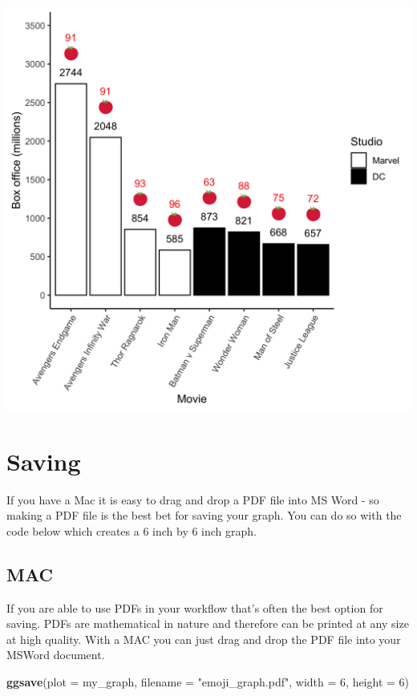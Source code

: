 \documentclass[
]{krantz}
\makeatletter
\newenvironment{Shaded}{\begin{snugshade}}{\end{snugshade}}
\newcommand{\DataTypeTok}[1]{\textcolor[rgb]{0.27,0.27,0.27}{#1}}
\newcommand{\DecValTok}[1]{\textcolor[rgb]{0.06,0.06,0.06}{#1}}
\newcommand{\KeywordTok}[1]{\textcolor[rgb]{0.27,0.27,0.27}{\textbf{#1}}}
\newcommand{\NormalTok}[1]{#1}
\newcommand{\StringTok}[1]{\textcolor[rgb]{0.5,0.5,0.5}{#1}}
\newenvironment{kframe}{%
\medskip{}
\setlength{\fboxsep}{.8em}
 \def\at@end@of@kframe{}%
 \ifinner\ifhmode%
  \def\at@end@of@kframe{\end{minipage}}%
  \begin{minipage}{\columnwidth}%
 \fi\fi%
 \def\FrameCommand##1{\hskip\@totalleftmargin \hskip-\fboxsep
 \colorbox{shadecolor}{##1}\hskip-\fboxsep
     \hskip-\linewidth \hskip-\@totalleftmargin \hskip\columnwidth}%
 \MakeFramed {\advance\hsize-\width
   \@totalleftmargin\z@ \linewidth\hsize
   \@setminipage}}%
 {\par\unskip\endMakeFramed%
 \at@end@of@kframe}
\renewenvironment{Shaded}{\begin{kframe}}{\end{kframe}}
\makeatother
\begin{document}
\includegraphics[width=0.85\linewidth]{ch_graphing/images/emoji_graph3}

\hypertarget{saving}{%
\section{Saving}\label{saving}}

If you have a Mac it is easy to drag and drop a PDF file into MS Word - so making a PDF file is the best bet for saving your graph. You can do so with the code below which creates a 6 inch by 6 inch graph.

\hypertarget{mac}{%
\subsection{MAC}\label{mac}}

If you are able to use PDFs in your workflow that's often the best option for saving. PDFs are mathematical in nature and therefore can be printed at any size at high quality. With a MAC you can just drag and drop the PDF file into your MSWord document.

\begin{Shaded}
\begin{Highlighting}[]
\KeywordTok{ggsave}\NormalTok{(}\DataTypeTok{plot =}\NormalTok{ my_graph, }
       \DataTypeTok{filename =} \StringTok{"emoji_graph.pdf"}\NormalTok{, }
       \DataTypeTok{width =} \DecValTok{6}\NormalTok{, }
       \DataTypeTok{height =} \DecValTok{6}\NormalTok{)}
\end{Highlighting}
\end{Shaded}
\end{document}
